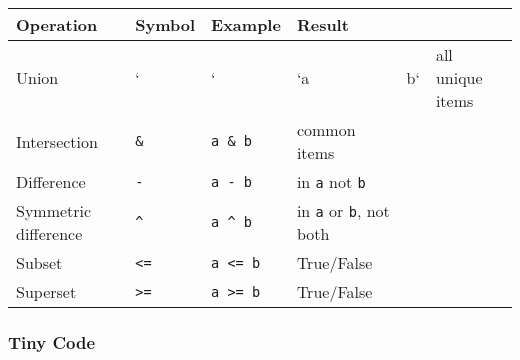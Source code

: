 \documentclass[
  letterpaper,
  DIV=11,
  numbers=noendperiod]{scrreprt}
\begin{document}
\begin{longtable}[]{@{}
  >{\raggedright\arraybackslash}p{}
  >{\raggedright\arraybackslash}p{}
  >{\raggedright\arraybackslash}p{}
  >{\raggedright\arraybackslash}p{}
  >{\raggedright\arraybackslash}p{}
  >{\raggedright\arraybackslash}p{}@{}}
\toprule\noalign{}
\begin{minipage}[b]{\linewidth}\raggedright
Operation
\end{minipage} & \begin{minipage}[b]{\linewidth}\raggedright
Symbol
\end{minipage} & \begin{minipage}[b]{\linewidth}\raggedright
Example
\end{minipage} & \begin{minipage}[b]{\linewidth}\raggedright
Result
\end{minipage} & \begin{minipage}[b]{\linewidth}\raggedright
\end{minipage} & \begin{minipage}[b]{\linewidth}\raggedright
\end{minipage} \\
\midrule\noalign{}
\endhead
\bottomrule\noalign{}
\endlastfoot
Union & ` & ` & `a & b` & all unique items \\
Intersection & \texttt{\&} & \texttt{a\ \&\ b} & common items & & \\
Difference & \texttt{-} & \texttt{a\ -\ b} & in \texttt{a} not
\texttt{b} & & \\
Symmetric difference & \texttt{\^{}} & \texttt{a\ \^{}\ b} & in
\texttt{a} or \texttt{b}, not both & & \\
Subset & \texttt{\textless{}=} & \texttt{a\ \textless{}=\ b} &
True/False & & \\
Superset & \texttt{\textgreater{}=} & \texttt{a\ \textgreater{}=\ b} &
True/False & & \\
\end{longtable}

\subsubsection{Tiny Code}\label{tiny-code-26}
\end{document}
